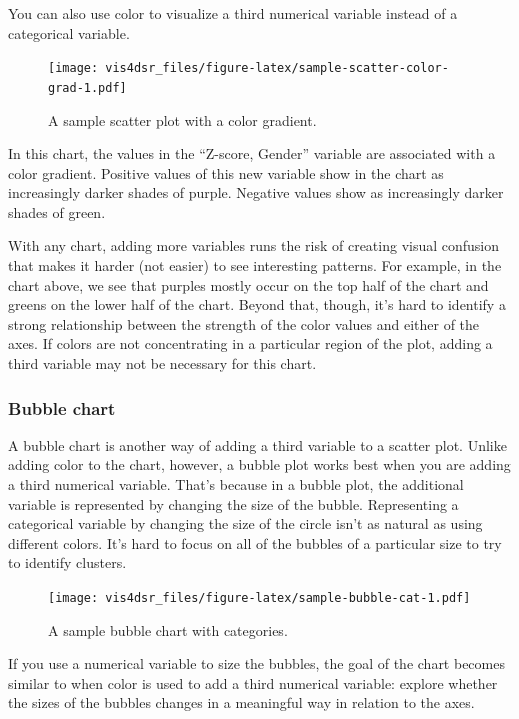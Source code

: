 \documentclass[
]{krantz}
\begin{document}
You can also use color to visualize a third numerical variable instead of a
categorical variable.

\begin{figure}
\centering
\texttt{[image: vis4dsr\_files/figure-latex/sample-scatter-color-grad-1.pdf]}
\caption{\label{fig:sample-scatter-color-grad}A sample scatter plot with a color gradient.}
\end{figure}

In this chart, the values in the ``Z-score, Gender'' variable are associated with
a color gradient. Positive values of this new variable show in the chart as
increasingly darker shades of purple. Negative values show as increasingly darker
shades of green.

With any chart, adding more variables runs the risk of creating visual confusion
that makes it harder (not easier) to see interesting patterns. For example,
in the chart above, we see that purples mostly occur on the top half of the chart
and greens on the lower half of the chart. Beyond that, though, it's hard to identify
a strong relationship between the strength of the color values and either of the axes.
If colors are not concentrating in a particular region of the plot, adding a third
variable may not be necessary for this chart.

\hypertarget{bubble-chart}{%
\subsubsection{Bubble chart}\label{bubble-chart}}

A bubble chart is another way of adding a third variable to a scatter plot. Unlike
adding color to the chart, however, a bubble plot works best when you are adding a
third numerical variable. That's because in a bubble plot, the additional variable
is represented by changing the size of the bubble. Representing a categorical variable
by changing the size of the circle isn't as natural as using different colors. It's
hard to focus on all of the bubbles of a particular size to try to identify clusters.

\begin{figure}
\centering
\texttt{[image: vis4dsr\_files/figure-latex/sample-bubble-cat-1.pdf]}
\caption{\label{fig:sample-bubble-cat}A sample bubble chart with categories.}
\end{figure}

If you use a numerical variable to size the bubbles, the goal of the chart becomes
similar to when color is used to add a third numerical variable: explore whether
the sizes of the bubbles changes in a meaningful way in relation to the axes.
\end{document}
